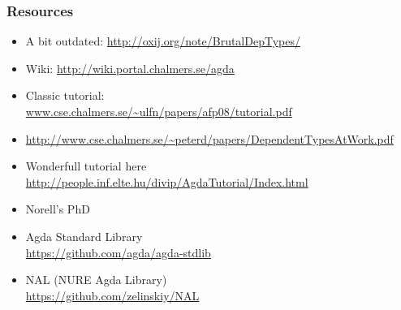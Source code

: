 \documentclass[xetex]{beamer}
\begin{document}
%    
%  

\begin{frame}
  \frametitle{Resources}
  \begin{itemize}
  \item A bit outdated: \url{http://oxij.org/note/BrutalDepTypes/}
  \item Wiki: \url{http://wiki.portal.chalmers.se/agda}
  \item Classic tutorial: \\ \url{www.cse.chalmers.se/~ulfn/papers/afp08/tutorial.pdf}
  \item \url{http://www.cse.chalmers.se/~peterd/papers/DependentTypesAtWork.pdf}
  \item Wonderfull tutorial here \\ \url{http://people.inf.elte.hu/divip/AgdaTutorial/Index.html}
  \item Norell's PhD
  \item Agda Standard Library \\ \url{https://github.com/agda/agda-stdlib}
  \item NAL (NURE Agda Library) \\ \url{https://github.com/zelinskiy/NAL}
  \end{itemize}
\end{frame}
\end{document}
